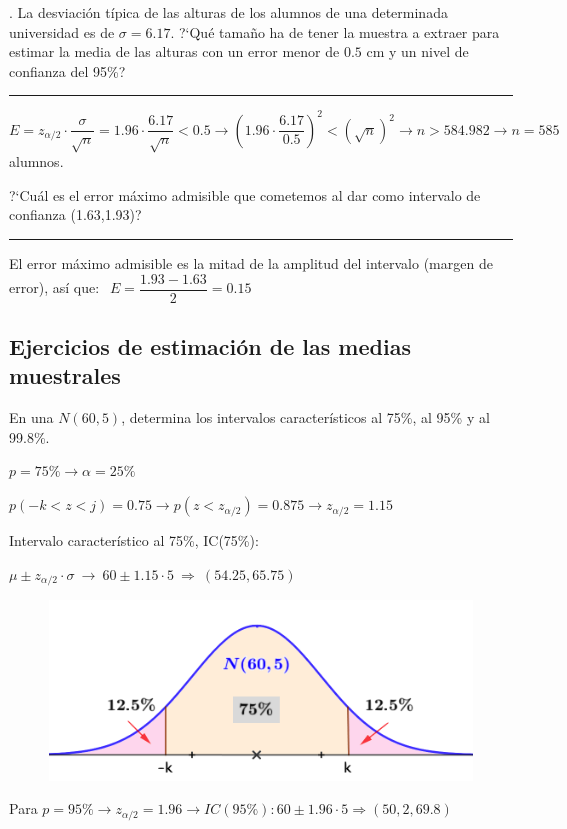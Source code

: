 \vspace{4mm} %
\begin{example}
.	La desviación típica de las alturas de los alumnos de una determinada universidad es de  $\sigma=6.17$. ?`Qué tamaño ha de tener la muestra a extraer para estimar la media de las alturas con un error menor de $0.5$ cm y un nivel de confianza del 95\%?	

\rule{150pt}{0.1pt}

\vspace{2mm}
$E=z_{\alpha/2}\cdot \dfrac {\sigma}{\sqrt{n}} = 1.96\cdot \dfrac{6.17}{\sqrt{n}}<0.5 \to \left( 1.96\cdot \dfrac{6.17}{0.5} \right)^2 < \left( \sqrt{n} \right)^2 \to n> 584.982 \to n=585$ alumnos.
\end{example}

\vspace{4mm}
\begin{ejemplo}
\begin{ejre}
?`Cuál es el error máximo admisible que cometemos al dar como intervalo de confianza (1.63,1.93)?	

\rule{150pt}{0.1pt}
\vspace{2mm}

El error máximo admisible es la mitad de la amplitud del intervalo (margen de error), así que:
$\ \ E=\dfrac{1.93-1.63}{2}=0.15$
\end{ejre}	
\end{ejemplo}

\subsection{Ejercicios de estimación de las medias muestrales}

\vspace{4mm}
\begin{ejemplo}
\begin{ejer}
	En una $N(60,5)$, determina los intervalos característicos al 75\%, al 95\% y al 99.8\%.
\end{ejer}
\end{ejemplo}
	\begin{multicols}{2}
	$p=75\% \to \alpha=25\%$
	
	$p(-k<z<j)=0.75 \to p(z<z_{\alpha/2})=0.875 \to z_{\alpha/2}=1.15$
	
	Intervalo característico al 75\%, IC(75\%): 
	
	$\mu \pm z_{\alpha/2}\cdot \sigma \ \to \ 60\pm 1.15 \cdot 5 \ \Rightarrow \ (54.25,65.75)$

	\begin{figure}[H]
	\centering
	\includegraphics[width=.5\textwidth]{imagenes/imagenes05/T05IM08.png}
	\end{figure}
	\end{multicols}
Para $p=95\% \to z_{\alpha/2}=1.96 \to IC(95\%): 60\pm 1.96\cdot 5 \Rightarrow (50,2,69.8)$

